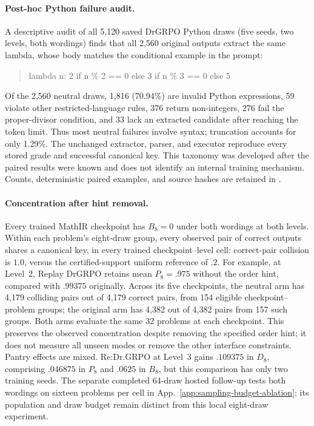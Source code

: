 \documentclass{article}
\newcommand{\1}{\mathbf 1}
\theoremstyle{remark}
\theoremstyle{definition}
\theoremstyle{plain}
\begin{document}
\paragraph{Post-hoc Python failure audit.}
A descriptive audit of all 5,120 saved DrGRPO Python draws (five seeds,
two levels, both wordings) finds that all 2,560 original outputs extract
the same lambda, whose body matches the conditional example in the prompt:
\begin{quote}\footnotesize\ttfamily
lambda n: 2 if n \% 2 == 0 else 3 if n \% 3 == 0 else 5
\end{quote}
Of the 2,560 neutral draws, 1,816 (70.94\%) are invalid Python expressions,
59 violate other restricted-language rules, 376 return non-integers,
276 fail the proper-divisor condition, and 33 lack an extracted candidate
after reaching the token limit. Thus most neutral failures involve syntax;
truncation accounts for only 1.29\%. The unchanged extractor, parser, and
executor reproduce every stored grade and successful canonical key.
This taxonomy was developed after the paired results were known and does
not identify an internal training mechanism. Counts, deterministic paired
examples, and source hashes are retained in
.

\paragraph{Concentration after hint removal.}
Every trained MathIR checkpoint has $B_8=0$ under both wordings at both levels.
Within each problem's eight-draw group, every observed pair of correct
outputs shares a canonical key, in every trained checkpoint--level cell:
correct-pair collision is $1.0$, versus the
certified-support uniform reference of $.2$. For example, at Level~2, Replay
DrGRPO retains mean $P_8=.975$ without the order hint, compared with $.99375$
originally. Across its five checkpoints, the neutral arm has 4,179 colliding
pairs out of 4,179 correct pairs, from 154 eligible checkpoint--problem
groups; the original arm has 4,382 out of 4,382 pairs from 157 such groups.
Both arms evaluate the same 32 problems at each checkpoint. This preserves
the observed concentration despite removing the specified order hint; it does
not measure all unseen modes or remove the other interface constraints.
Pantry effects are mixed. Re:Dr.GRPO at Level~3 gains $.109375$ in $D_8$,
comprising $.046875$ in $P_8$ and $.0625$ in $B_8$, but this comparison has only
two training seeds. The separate completed 64-draw hosted follow-up
tests both wordings on sixteen problems per cell in
App.~\ref{app:sampling-budget-ablation}; its population and draw budget
remain distinct from this local eight-draw experiment.
\end{document}

